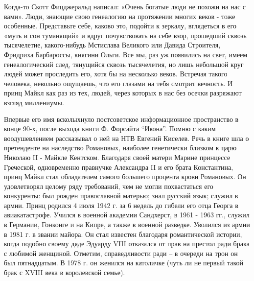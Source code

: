 \raggedcolumns
\begin{multicols}{3} %
\setlength{\parindent}{0pt}


\columnbreak
{}

\end{multicols} %

Когда-то Скотт Фицджеральд написал:  «Очень богатые люди не похожи на нас с
вами». Люди, знающие свою генеалогию на протяжении многих веков - тоже
особенные. Представьте себе, каково это, подойти к зеркалу, вглядеться в его
«муть и сон туманящий» и вдруг почувствовать на себе взор, прошедший сквозь
тысячелетие, какого-нибудь Мстислава Великого или Давида Строителя, Фридриха
Барбароссы, княгини Ольги. Все мы, раз уж появились на свет, имеем
генеалогический след, тянущийся сквозь тысячелетия, но лишь небольшой круг
людей может проследить его, хотя бы на несколько веков. Встречая такого
человека, невольно ощущаешь, что его глазами на тебя смотрит вечность. И принц
Майкл как раз из тех, людей, через которых в нас без осечки разряжают взгляд
миллениумы.


Впервые его имя всколыхнуло постсоветское информационное пространство в конце
90-х, после выхода книги Ф. Форсайта \enquote{Икона}. Помню с каким воодушевлением
рассказывал о ней на НТВ Евгений Киселев. Речь в книге шла о претенденте на
наследство Романовых, наиболее генетически близком к царю Николаю II - Майкле
Кентском. Благодаря своей матери Марине принцессе Греческой, одновременно
правнучке Александра II и его брата Константина, принц Майкл стал обладателем
самого большего процента крови Романовых. Он удовлетворял целому ряду
требований, чем не могли похвастаться его конкуренты: был рожден православной
матерью; знал русский язык; служил в армии. Принц родился 4 июля 1942 г. за 6
недель до гибели его отца Георга в авиакатастрофе. Учился в военной академии
Сандхерст, в 1961 - 1963 гг., служил в Германии, Гонконге и на Кипре, а также в
военной разведке. Уволился из армии в 1981 г. в звании майора. Он стал известен
благодаря романтической истории, когда подобно своему дяде Эдуарду VIII
отказался от прав на престол ради брака с любимой женщиной. Отметим,
справедливости ради – в очереди на трон он был пятнадцатым. В 1978 г. он
женился на католичке (чуть ли не первый такой брак с XVIII века в королевской
семье).

